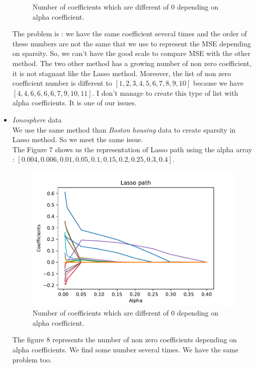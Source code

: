 \documentclass{article}
\begin{document}
\begin{itemize}
\begin{figure}[!ht]
    \caption{Number of coefficients which are different of $0$ depending on alpha coefficient.}
\end{figure}
The problem is : we have the same coefficient several times and the order of these numbers are not the same that we use to represent the MSE depending on sparsity. So, we can't have the good scale to compare MSE with the other method. The two other method has a growing number of non zero coefficient, it is not stagnant like the Lasso method. Moreover, the list of non zero coefficient number is different to $[1, 2, 3, 4, 5, 6, 7, 8, 9 ,10]$ because we have $[4, 4, 6, 6, 6, 6, 7, 9, 10, 11]$. I don't manage to create this type of list with alpha coefficients. It is one of our issues.
\\
   \item \textit{Ionosphere} data\\
We use the same method than \textit{Boston housing} data to create sparsity in Lasso method. So we meet the same issue.\\
The Figure $7$ shows us the representation of Lasso path using the alpha array : $[0.004,0.006,0.01,0.05,0.1,0.15, 0.2, 0.25, 0.3, 0.4]$.\\
   \begin{figure}[!ht]
    \centering
    \includegraphics[scale=0.6]{./images/alpha_choice_lasso.pdf}
    \caption{Number of coefficients which are different of $0$ depending on alpha coefficient.}
\end{figure}
The figure $8$ represents the number of non zero coefficients depending on alpha coefficients. We find some number several times. We have the same problem too.
\begin{figure}[!ht]
    \centering

\end{figure}
\end{itemize}
\end{document}
